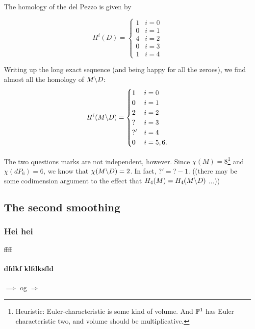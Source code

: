 \documentclass[11pt, english]{article}
\begin{document}
The homology of the del Pezzo is given by 

\[
H^i(D) = \begin{cases}
1 & i = 0 \\
0 & i = 1 \\
4 & i = 2 \\
0 & i = 3 \\
1 & i = 4
\end{cases}
\]

Writing up the long exact sequence (and being happy for all the zeroes), we find almost all the homology of $M \backslash D$:
\[
H^i(M \backslash D) = \begin{cases}
1 & i = 0 \\
0 & i = 1 \\
2 & i = 2 \\
? & i = 3 \\
?' & i = 4 \\
0 & i = 5,6.
\end{cases}
\]

The two questions marks are not independent, however. Since $\chi(M) = 8$\footnote{Heuristic: Euler-characteristic is some kind of volume. And $\mathbb{P}^1$ has Euler characteristic two, and volume should be multiplicative.} and $\chi(dP_6)=6$, we know that $\chi(M \backslash D) = 2$. In fact, $?'=?-1$. ((there may be some codimension argument to the effect that $H_4(M) = H_4(M \backslash D)$ ...))

\subsection{The second smoothing}

\subsubsection{Hei hei}

ffff

\paragraph{dfdkf klfdksfld }

$\implies$
og 
$\Rightarrow$ 



\end{document}
